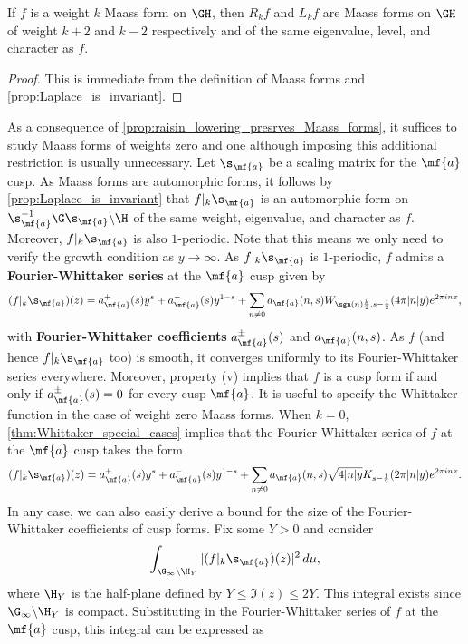     \begin{proposition}\label{prop:raisin_lowering_presrves_Maass_forms}
      If $f$ is a weight $k$ Maass form on $\GH$, then $R_{k}f$ and $L_{k}f$ are Maass forms on $\GH$ of weight $k+2$ and $k-2$ respectively and of the same eigenvalue, level, and character as $f$.
    \end{proposition}
    \begin{proof}
      This is immediate from the definition of Maass forms and \cref{prop:Laplace_is_invariant}.
    \end{proof}
  
    As a consequence of \cref{prop:raisin_lowering_presrves_Maass_forms}, it suffices to study Maass forms of weights zero and one although imposing this additional restriction is usually unnecessary. Let $\s_{\mf{a}}$ be a scaling matrix for the $\mf{a}$ cusp. As Maass forms are automorphic forms, it follows by \cref{prop:Laplace_is_invariant} that $f|_{k}\s_{\mf{a}}$ is an automorphic form on $\s_{\mf{a}}^{-1}\G\s_{\mf{a}}\backslash\H$ of the same weight, eigenvalue, and character as $f$. Moreover, $f|_{k}\s_{\mf{a}}$ is also $1$-periodic. Note that this means we only need to verify the growth condition as $y \to \infty$. As $f|_{k}\s_{\mf{a}}$ is $1$-periodic, $f$ admits a \textbf{Fourier-Whittaker series} at the $\mf{a}$ cusp given by
    \[
      (f|_{k}\s_{\mf{a}})(z) = a_{\mf{a}}^{+}(s)y^{s}+a_{\mf{a}}^{-}(s)y^{1-s}+\sum_{n \neq 0}a_{\mf{a}}(n,s)W_{\sgn(n)\frac{k}{2},s-\frac{1}{2}}(4\pi|n|y)e^{2\pi inx},
    \]
    with \textbf{Fourier-Whittaker coefficients} $a_{\mf{a}}^{\pm}(s)$ and $a_{\mf{a}}(n,s)$. As $f$ (and hence $f|_{k}\s_{\mf{a}}$ too) is smooth, it converges uniformly to its Fourier-Whittaker series everywhere. Moreover, property (v) implies that $f$ is a cusp form if and only if $a_{\mf{a}}^{\pm}(s) = 0$ for every cusp $\mf{a}$. It is useful to specify the Whittaker function in the case of weight zero Maass forms. When $k = 0$, \cref{thm:Whittaker_special_cases} implies that the Fourier-Whittaker series of $f$ at the $\mf{a}$ cusp takes the form
    \[
      (f|_{k}\s_{\mf{a}})(z) = a_{\mf{a}}^{+}(s)y^{s}+a_{\mf{a}}^{-}(s)y^{1-s}+\sum_{n \neq 0}a_{\mf{a}}(n,s)\sqrt{4|n|y}K_{s-\frac{1}{2}}(2\pi|n|y)e^{2\pi inx}.
    \]
    In any case, we can also easily derive a bound for the size of the Fourier-Whittaker coefficients of cusp forms. Fix some $Y > 0$ and consider
    \[
      \int_{\G_{\infty}\backslash\H_{Y}}|(f|_{k}\s_{\mf{a}})(z)|^{2}\,d\mu,
    \]
    where $\H_{Y}$ is the half-plane defined by $Y \le \Im(z) \le 2Y$. This integral exists since $\G_{\infty}\backslash\H_{Y}$ is compact. Substituting in the Fourier-Whittaker series of $f$ at the $\mf{a}$ cusp, this integral can be expressed as
